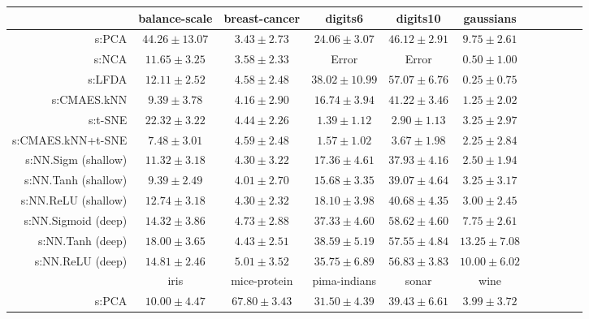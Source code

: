 \begin{table}[ht] \centering
{\small\renewcommand{\arraystretch}{0.95}
\setlength{\tabcolsep}{1pt}
\begin{tabular}{rcccccccccc}
\toprule


& \multicolumn{1}{c}{balance-scale} & \multicolumn{1}{c}{breast-cancer} & \multicolumn{1}{c}{digits6} & \multicolumn{1}{c}{digits10} & \multicolumn{1}{c}{gaussians} \\ 
\midrule
s:PCA & $44.26\pm13.07$ & $\bm{3.43\pm2.73}$ & $24.06\pm3.07$ & $46.12\pm2.91$ & $9.75\pm2.61$ \\
s:NCA & $11.65\pm3.25$ & $3.58\pm2.33$ & Error  & Error  & $0.50\pm1.00$ \\
s:LFDA & $12.11\pm2.52$ & $4.58\pm2.48$ & $38.02\pm10.99$ & $57.07\pm6.76$ & $\bm{0.25\pm0.75}$ \\
s:CMAES.kNN & $9.39\pm3.78$ & $4.16\pm2.90$ & $16.74\pm3.94$ & $41.22\pm3.46$ & $1.25\pm2.02$ \\
s:t-SNE & $22.32\pm3.22$ & $4.44\pm2.26$ & $\bm{1.39\pm1.12}$ & $\bm{2.90\pm1.13}$ & $3.25\pm2.97$ \\
s:CMAES.kNN+t-SNE & $\bm{7.48\pm3.01}$ & $4.59\pm2.48$ & $1.57\pm1.02$ & $3.67\pm1.98$ & $2.25\pm2.84$ \\
s:NN.Sigm (shallow) & $11.32\pm3.18$ & $4.30\pm3.22$ & $17.36\pm4.61$ & $37.93\pm4.16$ & $2.50\pm1.94$ \\
s:NN.Tanh (shallow) & $9.39\pm2.49$ & $4.01\pm2.70$ & $15.68\pm3.35$ & $39.07\pm4.64$ & $3.25\pm3.17$ \\
s:NN.ReLU (shallow) & $12.74\pm3.18$ & $4.30\pm2.32$ & $18.10\pm3.98$ & $40.68\pm4.35$ & $3.00\pm2.45$ \\
s:NN.Sigmoid (deep) & $14.32\pm3.86$ & $4.73\pm2.88$ & $37.33\pm4.60$ & $58.62\pm4.60$ & $7.75\pm2.61$ \\
s:NN.Tanh (deep) & $18.00\pm3.65$ & $4.43\pm2.51$ & $38.59\pm5.19$ & $57.55\pm4.84$ & $13.25\pm7.08$ \\
s:NN.ReLU (deep) & $14.81\pm2.46$ & $5.01\pm3.52$ & $35.75\pm6.89$ & $56.83\pm3.83$ & $10.00\pm6.02$ \\
\midrule
& \multicolumn{1}{c}{iris} & \multicolumn{1}{c}{mice-protein} & \multicolumn{1}{c}{pima-indians} & \multicolumn{1}{c}{sonar} & \multicolumn{1}{c}{wine} \\ 
\midrule
s:PCA & $10.00\pm4.47$ & $67.80\pm3.43$ & $31.50\pm4.39$ & $39.43\pm6.61$ & $3.99\pm3.72$ \\

\end{tabular}}
\end{table}
